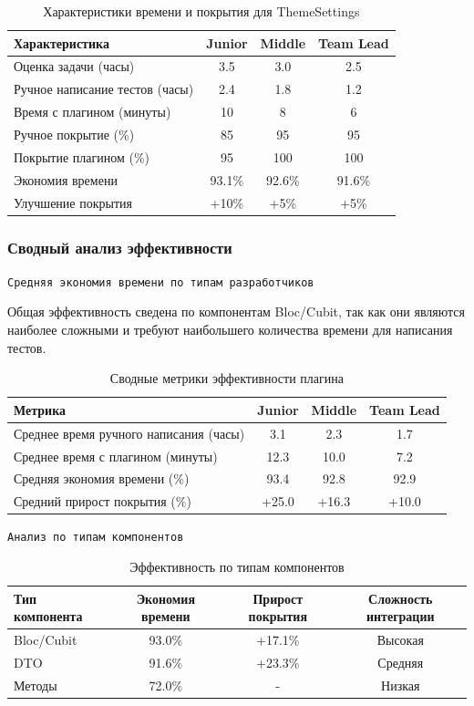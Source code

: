 \documentclass[14pt, russian]{scrartcl}
\begin{document}
\begin{table}[h!]
\centering
\caption{Характеристики времени и покрытия для ThemeSettings}
\begin{tabular}{|l|c|c|c|}
\hline
Характеристика & Junior & Middle & Team Lead \\
\hline
Оценка задачи (часы) & 3.5 & 3.0 & 2.5 \\
Ручное написание тестов (часы) & 2.4 & 1.8 & 1.2 \\
Время с плагином (минуты) & 10 & 8 & 6 \\
Ручное покрытие (\%) & 85 & 95 & 95 \\
Покрытие плагином (\%) & 95 & 100 & 100 \\
Экономия времени & 93.1\% & 92.6\% & 91.6\% \\
Улучшение покрытия & +10\% & +5\% & +5\% \\
\hline
\end{tabular}
\vspace{1ex}
\end{table}

\subsubsection{Сводный анализ эффективности}

\texttt{Средняя экономия времени по типам разработчиков}

Общая эффективность сведена по компонентам Bloc/Cubit, так как они являются наиболее сложными и требуют наибольшего количества времени для написания тестов.

\begin{table}[h!]
\centering
\caption{Сводные метрики эффективности плагина}
\begin{tabular}{|l|c|c|c|}
\hline
Метрика & Junior & Middle & Team Lead \\
\hline
Среднее время ручного написания (часы) & 3.1 & 2.3 & 1.7 \\
Среднее время с плагином (минуты) & 12.3 & 10.0 & 7.2 \\
Средняя экономия времени (\%) & 93.4 & 92.8 & 92.9 \\
Средний прирост покрытия (\%) & +25.0 & +16.3 & +10.0 \\
\hline
\end{tabular}
\vspace{1ex}
\end{table}

\texttt{Анализ по типам компонентов}

\begin{table}[h!]
\centering
\caption{Эффективность по типам компонентов}
\begin{tabular}{|l|c|c|c|}
\hline
Тип компонента & Экономия времени & Прирост покрытия & Сложность интеграции \\
\hline
Bloc/Cubit & 93.0\% & +17.1\% & Высокая \\
DTO & 91.6\% & +23.3\% & Средняя \\
Методы & 72.0\% & - & Низкая \\
\hline
\end{tabular}
\vspace{1ex}
\end{table}
\end{document}

